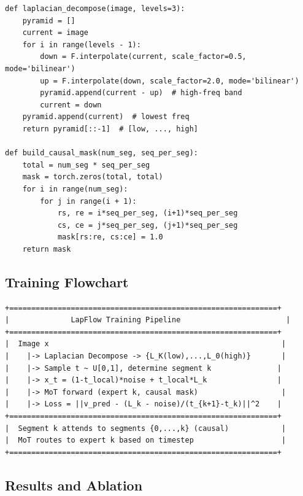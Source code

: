 \documentclass[11pt, a4paper]{article}
\begin{document}
\begin{lstlisting}[caption={LapFlow: Decomposition and Causal Mask}]
def laplacian_decompose(image, levels=3):
    pyramid = []
    current = image
    for i in range(levels - 1):
        down = F.interpolate(current, scale_factor=0.5, mode='bilinear')
        up = F.interpolate(down, scale_factor=2.0, mode='bilinear')
        pyramid.append(current - up)  # high-freq band
        current = down
    pyramid.append(current)  # lowest freq
    return pyramid[::-1]  # [low, ..., high]

def build_causal_mask(num_seg, seq_per_seg):
    total = num_seg * seq_per_seg
    mask = torch.zeros(total, total)
    for i in range(num_seg):
        for j in range(i + 1):
            rs, re = i*seq_per_seg, (i+1)*seq_per_seg
            cs, ce = j*seq_per_seg, (j+1)*seq_per_seg
            mask[rs:re, cs:ce] = 1.0
    return mask
\end{lstlisting}

\subsection{Training Flowchart}

\begin{lstlisting}[style=flowchart, caption={LapFlow Training}]
+=============================================================+
|              LapFlow Training Pipeline                        |
+=============================================================+
|  Image x                                                     |
|    |-> Laplacian Decompose -> {L_K(low),...,L_0(high)}       |
|    |-> Sample t ~ U[0,1], determine segment k               |
|    |-> x_t = (1-t_local)*noise + t_local*L_k                |
|    |-> MoT forward (expert k, causal mask)                   |
|    |-> Loss = ||v_pred - (L_k - noise)/(t_{k+1}-t_k)||^2    |
+=============================================================+
|  Segment k attends to segments {0,...,k} (causal)            |
|  MoT routes to expert k based on timestep                    |
+=============================================================+
\end{lstlisting}

\subsection{Results and Ablation}
\end{document}
